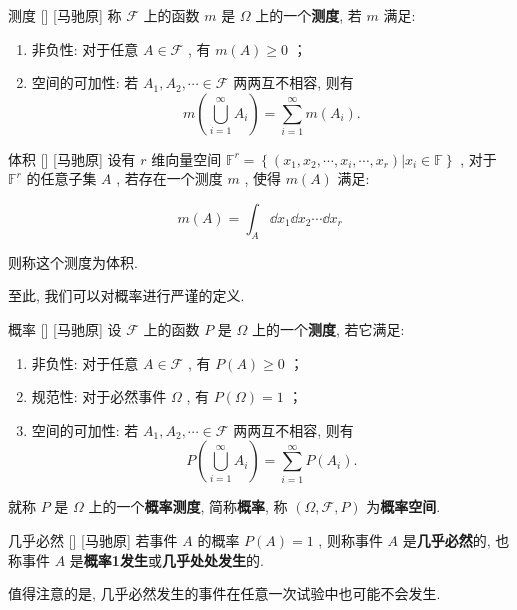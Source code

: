 \documentclass[UTF8]{ctexart}
\begin{document}
        \begin{dfn}
            []
            {测度}
            []
            [马驰原]
            称 \(\mathcal{F}\) 上的函数 \(m\) 是 \(\Omega\) 上的一个\textbf{测度}, 若 \(m\) 满足: 

            \begin{enumerate}
                \item 非负性: 对于任意 \(A\in\mathcal{F}\) , 有 \(m(A)\geq 0\) ；
                \item 空间的可加性: 若 \(A_1,A_2,\cdots\in\mathcal{F}\) 两两互不相容, 则有\[m\left(\bigcup_{i=1}^{\infty}A_i\right)=\sum_{i=1}^{\infty}m(A_i).\]
            \end{enumerate}
        \end{dfn}

        \begin{dfn}
            []
            {体积}
            []
            [马驰原]
            设有 \(r\) 维向量空间 \(\mathbb{F}^r=\left\{(x_1,x_2,\cdots,x_i,\cdots,x_r)|x_i\in\mathbb{F}\right\} \) , 对于 \(\mathbb{F}^r\) 的任意子集 \(A\) , 若存在一个测度 \(m\) , 使得 \(m(A)\) 满足: 

            \[m(A)=\int_{A}\dd x_1\dd x_2\cdots\dd x_r\]

            则称这个测度为体积. 
        \end{dfn}

        至此, 我们可以对概率进行严谨的定义. 

        \begin{dfn}
            []
            {概率}
            []
            [马驰原]
            设 \(\mathcal{F}\) 上的函数 \(P\) 是 \(\Omega\) 上的一个\textbf{测度}, 若它满足: 

            \begin{enumerate}
                \item 非负性: 对于任意 \(A\in\mathcal{F}\) , 有 \(P(A)\geq 0\) ；
                \item 规范性: 对于必然事件 \(\Omega\) , 有 \(P(\Omega)=1\) ；
                \item 空间的可加性: 若 \(A_1,A_2,\cdots\in\mathcal{F}\) 两两互不相容, 则有\[P\left(\bigcup_{i=1}^{\infty}A_i\right)=\sum_{i=1}^{\infty}P(A_i).\]
            \end{enumerate}
            就称 \(P\) 是 \(\Omega\) 上的一个\textbf{概率测度}, 简称\textbf{概率}, 称 \((\Omega,\mathcal{F},P)\) 为\textbf{概率空间}. 
        \end{dfn}

        \begin{dfn}
            []
            {几乎必然}
            []
            [马驰原]
            若事件 \(A\) 的概率 \(P(A)=1\) , 则称事件 \(A\) 是\textbf{几乎必然}的, 也称事件 \(A\) 是\textbf{概率1发生}或\textbf{几乎处处发生}的. 

            值得注意的是, 几乎必然发生的事件在任意一次试验中也可能不会发生. 
        \end{dfn}
\end{document}
